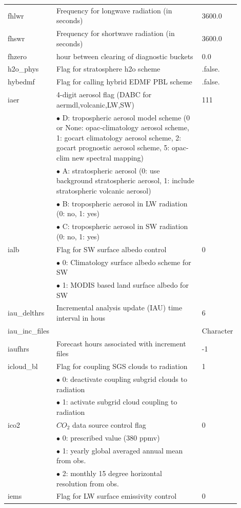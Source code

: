 \documentclass[11pt,fleqn]{report}              %
\begin{document}
\begin{enumerate}
{\begin{longtable}{p{0.17\linewidth} | p{0.65\linewidth} | p{0.08\linewidth} }
fhlwr & Frequency for longwave radiation (in seconds) & 3600.0  \\
fhswr & Frequency for shortwave radiation (in seconds) & 3600.0 \\
fhzero & hour between clearing of diagnostic buckets & 0.0 \\
h2o\_phys & Flag for stratosphere h2o scheme & .false. \\
hybedmf & Flag for calling hybrid EDMF PBL scheme & .false. \\
iaer & 4-digit aerosol flag (DABC for aermdl,volcanic,LW,SW) & 111 \\
& $\bullet$ D: tropospheric aerosol model scheme (0 or None: opac-climatology aerosol scheme, 1: gocart climatology aerosol scheme, 2: gocart prognostic aerosol scheme, 5: opac-clim new spectral mapping) & \\
& $\bullet$ A: stratospheric aerosol (0: use background stratospheric aerosol, 1: include stratospheric volcanic aerosol) & \\
& $\bullet$ B: tropospheric aerosol in LW radiation (0: no, 1: yes) & \\
& $\bullet$ C: tropospheric aerosol in SW radiation (0: no, 1: yes) & \\
ialb & Flag for SW surface albedo control & 0 \\
 & $\bullet$ 0: Climatology surface albedo scheme for SW & \\
 & $\bullet$ 1: MODIS based land surface albedo for SW & \\
iau\_delthrs & Incremental analysis update (IAU) time interval in hous & 6 \\
iau\_inc\_files & & Character \\
iaufhrs & Forecast hours associated with increment files & -1 \\
icloud\_bl & Flag for coupling SGS clouds to radiation & 1 \\
& $\bullet$ 0: deactivate coupling subgrid clouds to radiation & \\
& $\bullet$ 1: activate subgrid cloud coupling to radiation & \\
ico2 & $CO_2$ data source control flag & 0 \\
& $\bullet$ 0: prescribed value (380 ppmv) & \\
& $\bullet$ 1: yearly global averaged annual mean from obs. & \\
& $\bullet$ 2: monthly 15 degree horizontal resolution from obs. & \\
iems & Flag for LW surface emissivity control & 0 \\

\end{longtable}}
\end{enumerate}
\end{document}
